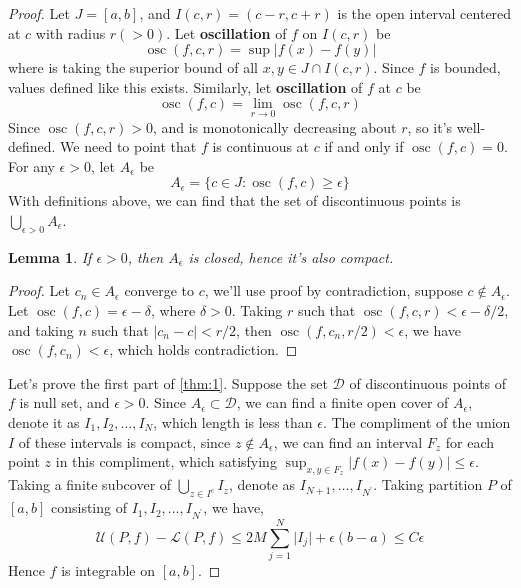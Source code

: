 \documentclass[a4paper]{article}
\newtheorem{lemma}[theorem]{Lemma}
\numberwithin{equation}{subsection}
\DeclareMathOperator{\osc}{osc}
\begin{document}
\begin{proof}

\par Let $J = [a,b]$, and $I(c, r) = (c-r, c+r)$ is the open interval centered at $c$ with radius $r(>0)$. Let \textbf{oscillation} of $f$ on $I(c, r)$ be
\begin{equation}
    \osc(f, c, r) = \sup \lvert f(x) - f(y) \rvert
\end{equation}
where is taking the superior bound of all $x, y \in J \cap I(c, r)$. Since $f$ is bounded, values defined like this exists. Similarly, let \textbf{oscillation} of $f$ at $c$ be
\begin{equation}
    \osc(f, c) = \lim_{r \to 0} \osc(f, c, r)
\end{equation}
Since $\osc(f,c,r)>0$, and is monotonically decreasing about $r$, so it's well-defined. We need to point that $f$ is continuous at $c$ if and only if $\osc(f,c)=0$. For any $\epsilon > 0$, let $A_\epsilon$ be
\begin{equation}
    A_\epsilon = \{c\in J : \osc(f, c) \geq \epsilon\}
\end{equation}
With definitions above, we can find that the set of discontinuous points is $\bigcup_{\epsilon>0} A_\epsilon$.

\begin{lemma}
    If $\epsilon>0$, then $A_\epsilon$ is closed, hence it's also compact.
\end{lemma}
\begin{proof}
    Let $c_n \in A_\epsilon$ converge to $c$, we'll use proof by contradiction, suppose $c \notin A_\epsilon$. Let $\osc(f,c) = \epsilon - \delta$, where $\delta > 0$. Taking $r$ such that $\osc(f,c,r)<\epsilon-\delta/2$, and taking $n$ such that $\lvert c_n - c \rvert < r/2$, then $\osc(f, c_n, r/2) < \epsilon$, we have $\osc(f, c_n) < \epsilon$, which holds contradiction.
\end{proof}

\par Let's prove the first part of \cref{thm:1}. Suppose the set $\mathcal{D}$ of discontinuous points of $f$ is null set, and $\epsilon>0$. Since $A_\epsilon \subset \mathcal{D}$, we can find a finite open cover of $A_\epsilon$, denote it as $I_1, I_2, \dots, I_N$, which length is less than $\epsilon$. The compliment of the union $I$ of these intervals is compact, since $z \notin A_\epsilon$, we can find an interval $F_z$ for each point $z$ in this compliment, which satisfying $\sup_{x, y \in F_z} \lvert f(x) - f(y) \rvert \leq \epsilon$. Taking a finite subcover of $\bigcup_{z\in I^c} I_z$, denote as $I_{N+1}, \dots, I_{N^\prime}$. Taking partition $P$ of $[a,b]$ consisting of $I_1, I_2, \dots, I_{N^\prime}$, we have,
\begin{equation}
    \mathcal{U}(P, f) - \mathcal{L}(P, f) \leq 2M\sum_{j=1}^{N} \lvert I_j \rvert + \epsilon(b - a) \leq C\epsilon
\end{equation}
Hence $f$ is integrable on $[a,b]$.


\end{proof}
\end{document}
